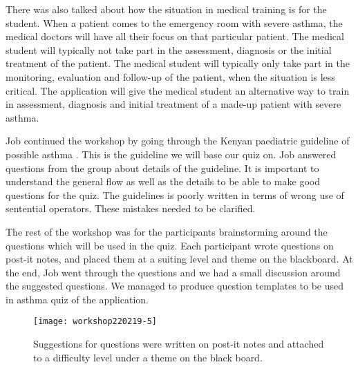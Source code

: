  There was also talked about how the situation in medical training is for the student. When a patient comes to the emergency room with severe asthma, the medical doctors will have all their focus on that particular patient. The medical student will typically not take part in the assessment, diagnosis or the initial treatment of the patient. The medical student will typically only take part in the monitoring, evaluation and follow-up of the patient, when the situation is less critical. The application will give the medical student an alternative way to train in assessment, diagnosis and initial treatment of a made-up patient with severe asthma. 

Job continued the workshop by going through the Kenyan paediatric guideline of possible asthma \parencite{RepublicofKeny2016}. This is the guideline we will base our quiz on. Job answered questions from the group about details of the guideline. It is important to understand the general flow as well as the details to be able to make good questions for the quiz. The guidelines is poorly written in terms of wrong use of sentential operators. These mistakes needed to be clarified.

The rest of the workshop was for the participants brainstorming around the questions which will be used in the quiz. Each participant wrote questions on post-it notes, and placed them at a suiting level and theme on the blackboard. At the end, Job went through the questions and we had a small discussion around the suggested questions. We managed to produce question templates to be used in asthma quiz of the application.

\begin{figure}[h!]
	\caption {Suggestions for questions were written on post-it notes and attached to a difficulty level under a theme on the black board.}
	\texttt{[image: workshop220219-5]}
\end{figure}